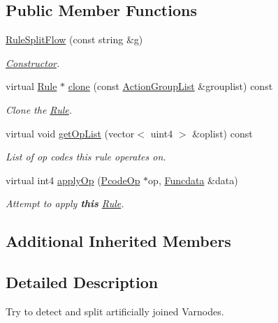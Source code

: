 \subsection*{Public Member Functions}
\begin{DoxyCompactItemize}
\item 
\mbox{\hyperlink{class_rule_split_flow_a2ad3e774bee151873b79dafdefbcf25b}{Rule\+Split\+Flow}} (const string \&g)
\begin{DoxyCompactList}\small\item\em \mbox{\hyperlink{class_constructor}{Constructor}}. \end{DoxyCompactList}\item 
virtual \mbox{\hyperlink{class_rule}{Rule}} $\ast$ \mbox{\hyperlink{class_rule_split_flow_a2eb007bc2f4ef7c6c11c0bfb15896c7a}{clone}} (const \mbox{\hyperlink{class_action_group_list}{Action\+Group\+List}} \&grouplist) const
\begin{DoxyCompactList}\small\item\em Clone the \mbox{\hyperlink{class_rule}{Rule}}. \end{DoxyCompactList}\item 
virtual void \mbox{\hyperlink{class_rule_split_flow_adfc8fe9bd2e6a1aafed0a44605fd7fda}{get\+Op\+List}} (vector$<$ uint4 $>$ \&oplist) const
\begin{DoxyCompactList}\small\item\em List of op codes this rule operates on. \end{DoxyCompactList}\item 
virtual int4 \mbox{\hyperlink{class_rule_split_flow_a7d4caa289d33f6ee12571bbc4abdc91d}{apply\+Op}} (\mbox{\hyperlink{class_pcode_op}{Pcode\+Op}} $\ast$op, \mbox{\hyperlink{class_funcdata}{Funcdata}} \&data)
\begin{DoxyCompactList}\small\item\em Attempt to apply {\bfseries{this}} \mbox{\hyperlink{class_rule}{Rule}}. \end{DoxyCompactList}\end{DoxyCompactItemize}
\subsection*{Additional Inherited Members}


\subsection{Detailed Description}
Try to detect and split artificially joined Varnodes. 

